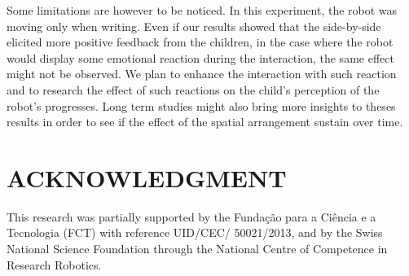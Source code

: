 \documentclass[letterpaper, 10 pt, conference]{ieeeconf}  %
\begin{document}
Some limitations are however to be noticed. 
In this experiment, the robot was moving only when writing. 
Even if our results showed that the side-by-side elicited more positive feedback from the children, in the case where the robot would display some emotional reaction during the interaction, the same effect might not be observed. 
We plan to enhance the interaction with such reaction and to research the effect of such reactions on the child's perception of the robot's progresses. 
Long term studies might also bring more insights to theses results in order to see if the effect of the spatial arrangement sustain over time.













\section*{ACKNOWLEDGMENT}
This research was partially supported by the Funda\c{c}\~{a}o para a Ci\^{e}ncia
e a Tecnologia (FCT) with reference UID/CEC/ 50021/2013, and by the Swiss
National Science Foundation through the National Centre of Competence in
Research Robotics.






\small


\end{document}
